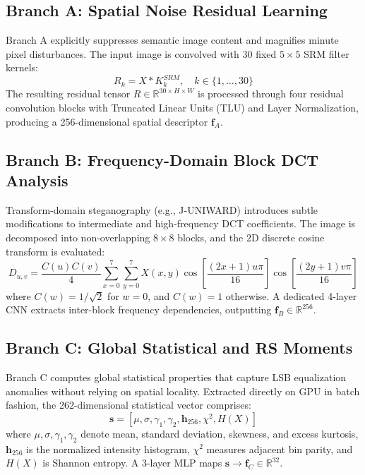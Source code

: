 \documentclass[journal]{IEEEtran}
\begin{document}
\subsection{Branch A: Spatial Noise Residual Learning}
Branch A explicitly suppresses semantic image content and magnifies minute pixel disturbances. The input image is convolved with 30 fixed $5 \times 5$ SRM filter kernels:
\begin{equation}
    R_k = X * K_k^{SRM}, \quad k \in \{1, \dots, 30\}
\end{equation}
The resulting residual tensor $R \in \mathbb{R}^{30 \times H \times W}$ is processed through four residual convolution blocks with Truncated Linear Units (TLU) and Layer Normalization, producing a 256-dimensional spatial descriptor $\mathbf{f}_A$.

\subsection{Branch B: Frequency-Domain Block DCT Analysis}
Transform-domain steganography (e.g., J-UNIWARD) introduces subtle modifications to intermediate and high-frequency DCT coefficients. The image is decomposed into non-overlapping $8 \times 8$ blocks, and the 2D discrete cosine transform is evaluated:
\begin{equation}
    D_{u,v} = \frac{C(u) C(v)}{4} \sum_{x=0}^{7} \sum_{y=0}^{7} X(x,y) \cos\left[\frac{(2x+1)u\pi}{16}\right] \cos\left[\frac{(2y+1)v\pi}{16}\right]
\end{equation}
where $C(w) = 1/\sqrt{2}$ for $w=0$, and $C(w)=1$ otherwise. A dedicated 4-layer CNN extracts inter-block frequency dependencies, outputting $\mathbf{f}_B \in \mathbb{R}^{256}$.

\subsection{Branch C: Global Statistical and RS Moments}
Branch C computes global statistical properties that capture LSB equalization anomalies without relying on spatial locality. Extracted directly on GPU in batch fashion, the 262-dimensional statistical vector comprises:
\begin{equation}
    \mathbf{s} = \left[ \mu, \sigma, \gamma_1, \gamma_2, \mathbf{h}_{256}, \chi^2, H(X) \right]
\end{equation}
where $\mu, \sigma, \gamma_1, \gamma_2$ denote mean, standard deviation, skewness, and excess kurtosis, $\mathbf{h}_{256}$ is the normalized intensity histogram, $\chi^2$ measures adjacent bin parity, and $H(X)$ is Shannon entropy. A 3-layer MLP maps $\mathbf{s} \to \mathbf{f}_C \in \mathbb{R}^{32}$.
\end{document}
